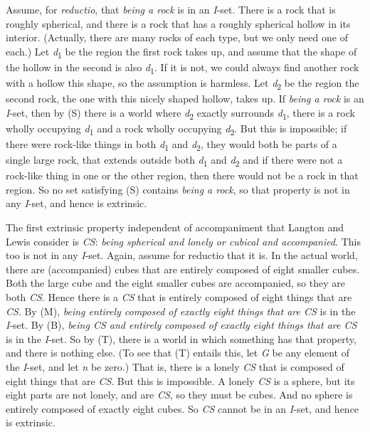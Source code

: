 Assume, for \textit{reductio}, that \textit{being a rock} is in an \textit{I}\nobreakdash-set. There is a rock that is roughly spherical, and there is a rock that has a roughly spherical hollow in its interior. (Actually, there are many rocks of each type, but we only need one of each.) Let \textit{d}\textsubscript{1} be the region the first rock takes up, and assume that the shape of the hollow in the second is also \textit{d}\textsubscript{1}. If it is not, we could always find another rock with a hollow this shape, so the assumption is harmless. Let \textit{d}\textsubscript{2} be the region the second rock, the one with this nicely shaped hollow, takes up. If \textit{being a rock} is an \textit{I}\nobreakdash-set, then by (S) there is a world where \textit{d}\textsubscript{2} exactly surrounds \textit{d}\textsubscript{1}, there is a rock wholly occupying \textit{d}\textsubscript{1} and a rock wholly occupying\textit{ d}\textsubscript{2}. But this is impossible; if there were rock\nobreakdash-like things in both \textit{d}\textsubscript{1} and \textit{d}\textsubscript{2}, they would both be parts of a single large rock, that extends outside both \textit{d}\textsubscript{1} and \textit{d}\textsubscript{2} and if there were not a rock\nobreakdash-like thing in one or the other region, then there would not be a rock in that region. So no set satisfying (S) contains \textit{being a rock}, so that property is not in any \textit{I}\nobreakdash-set, and hence is extrinsic.

The first extrinsic property independent of accompaniment that Langton and Lewis consider is \textit{CS}: \textit{being spherical and lonely or cubical and accompanied}. This too is not in any \textit{I}\nobreakdash-set. Again, assume for reductio that it is. In the actual world, there are (accompanied) cubes that are entirely composed of eight smaller cubes. Both the large cube and the eight smaller cubes are accompanied, so they are both \textit{CS}. Hence there is a \textit{CS} that is entirely composed of eight things that are \textit{CS}. By (M), \textit{being entirely composed of exactly eight things that are CS} is in the \textit{I}\nobreakdash-set. By (B), \textit{being CS and entirely composed of exactly eight things that are CS} is in the \textit{I}\nobreakdash-set. So by (T), there is a world in which something has that property, and there is nothing else. (To see that (T) entails this, let \textit{G} be any element of the \textit{I}\nobreakdash-set, and let \textit{n} be zero.) That is, there is a lonely \textit{CS} that is composed of eight things that are \textit{CS}. But this is impossible. A lonely \textit{CS} is a sphere, but its eight parts are not lonely, and are \textit{CS}, so they must be cubes. And no sphere is entirely composed of exactly eight cubes. So \textit{CS} cannot be in an \textit{I}\nobreakdash-set, and hence is extrinsic.


